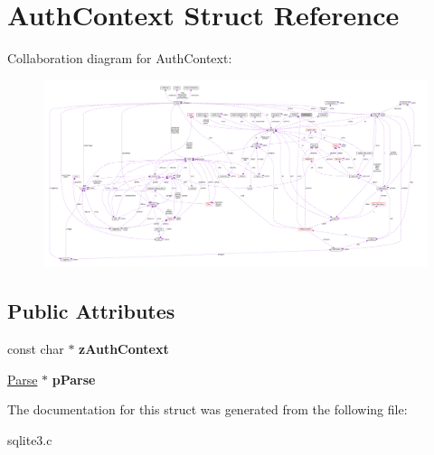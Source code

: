 \hypertarget{structAuthContext}{}\section{Auth\+Context Struct Reference}
\label{structAuthContext}


Collaboration diagram for Auth\+Context\+:\nopagebreak
\begin{figure}[H]
\begin{center}
\leavevmode
\includegraphics[width=350pt]{structAuthContext__coll__graph}
\end{center}
\end{figure}
\subsection*{Public Attributes}
\begin{DoxyCompactItemize}
\item 
const char $\ast$ {\bfseries z\+Auth\+Context}\hypertarget{structAuthContext_a1b095b152b72326476ac3f7edcaee78a}{}\label{structAuthContext_a1b095b152b72326476ac3f7edcaee78a}

\item 
\hyperlink{structParse}{Parse} $\ast$ {\bfseries p\+Parse}\hypertarget{structAuthContext_a8df2931d8f4facf59073c92315b00bfa}{}\label{structAuthContext_a8df2931d8f4facf59073c92315b00bfa}

\end{DoxyCompactItemize}


The documentation for this struct was generated from the following file\+:\begin{DoxyCompactItemize}
\item 
sqlite3.\+c\end{DoxyCompactItemize}
